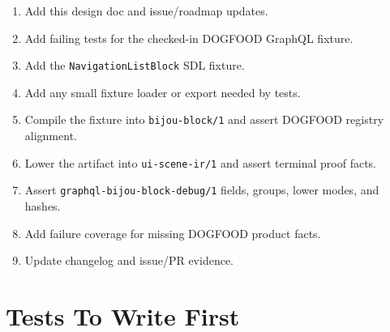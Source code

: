 \begin{enumerate}
\def\labelenumi{\arabic{enumi}.}
\tightlist
\item
  Add this design doc and issue/roadmap updates.
\item
  Add failing tests for the checked-in DOGFOOD GraphQL fixture.
\item
  Add the \texttt{N\allowbreak{}a\allowbreak{}v\allowbreak{}i\allowbreak{}g\allowbreak{}a\allowbreak{}t\allowbreak{}i\allowbreak{}o\allowbreak{}n\allowbreak{}L\allowbreak{}i\allowbreak{}s\allowbreak{}t\allowbreak{}B\allowbreak{}l\allowbreak{}o\allowbreak{}c\allowbreak{}k} SDL fixture.
\item
  Add any small fixture loader or export needed by tests.
\item
  Compile the fixture into \texttt{b\allowbreak{}i\allowbreak{}j\allowbreak{}o\allowbreak{}u\allowbreak{}-\allowbreak{}b\allowbreak{}l\allowbreak{}o\allowbreak{}c\allowbreak{}k\allowbreak{}/\allowbreak{}1} and assert DOGFOOD registry alignment.
\item
  Lower the artifact into \texttt{u\allowbreak{}i\allowbreak{}-\allowbreak{}s\allowbreak{}c\allowbreak{}e\allowbreak{}n\allowbreak{}e\allowbreak{}-\allowbreak{}i\allowbreak{}r\allowbreak{}/\allowbreak{}1} and assert terminal proof facts.
\item
  Assert \texttt{g\allowbreak{}r\allowbreak{}a\allowbreak{}p\allowbreak{}h\allowbreak{}q\allowbreak{}l\allowbreak{}-\allowbreak{}b\allowbreak{}i\allowbreak{}j\allowbreak{}o\allowbreak{}u\allowbreak{}-\allowbreak{}b\allowbreak{}l\allowbreak{}o\allowbreak{}c\allowbreak{}k\allowbreak{}-\allowbreak{}d\allowbreak{}e\allowbreak{}b\allowbreak{}u\allowbreak{}g\allowbreak{}/\allowbreak{}1} fields, groups, lower modes, and hashes.
\item
  Add failure coverage for missing DOGFOOD product facts.
\item
  Update changelog and issue/PR evidence.
\end{enumerate}

\section{Tests To Write First}\label{record-142-tests-to-write-first}

